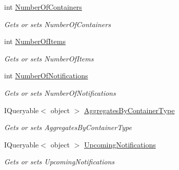 \begin{DoxyCompactItemize}
\item 
int \mbox{\hyperlink{class_gtd_app_1_1_console_1_1_views_1_1_dashboard_view_aad8d08289ff660290ce51818a14dc0d5}{Number\+Of\+Containers}}
\begin{DoxyCompactList}\small\item\em Gets or sets Number\+Of\+Containers \end{DoxyCompactList}\item 
int \mbox{\hyperlink{class_gtd_app_1_1_console_1_1_views_1_1_dashboard_view_a07114ddd8544eb282d98fb5bfbeb3d82}{Number\+Of\+Items}}
\begin{DoxyCompactList}\small\item\em Gets or sets Number\+Of\+Items \end{DoxyCompactList}\item 
int \mbox{\hyperlink{class_gtd_app_1_1_console_1_1_views_1_1_dashboard_view_a971a146445eabc3eb7c65df222f1a91e}{Number\+Of\+Notifications}}
\begin{DoxyCompactList}\small\item\em Gets or sets Number\+Of\+Notifications \end{DoxyCompactList}\item 
I\+Queryable$<$ object $>$ \mbox{\hyperlink{class_gtd_app_1_1_console_1_1_views_1_1_dashboard_view_a049dfc8aed57839b35cf27cde4c3626b}{Aggregates\+By\+Container\+Type}}
\begin{DoxyCompactList}\small\item\em Gets or sets Aggregates\+By\+Container\+Type \end{DoxyCompactList}\item 
I\+Queryable$<$ object $>$ \mbox{\hyperlink{class_gtd_app_1_1_console_1_1_views_1_1_dashboard_view_a412b01fb583fdec5f99688fba0769031}{Upcoming\+Notifications}}
\begin{DoxyCompactList}\small\item\em Gets or sets Upcoming\+Notifications \end{DoxyCompactList}\end{DoxyCompactItemize}
